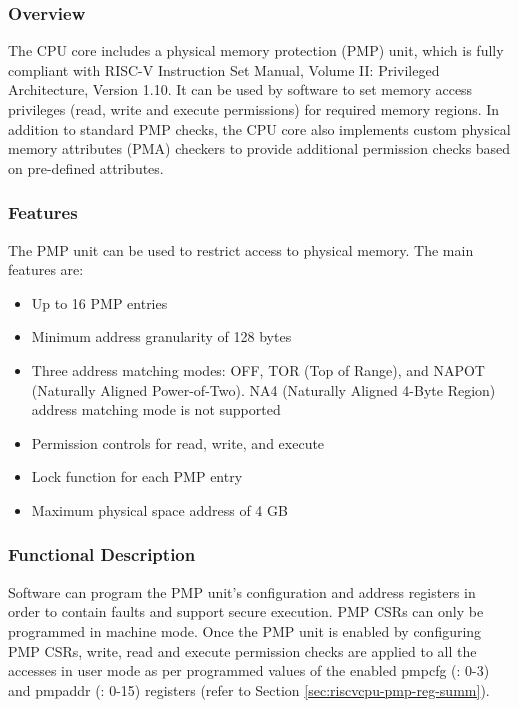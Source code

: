 \documentclass[main\_\_EN.tex]{subfiles}
\begin{document}
\subsubsection{Overview}
\label{sec:riscvcpu-pmp-overview}
The CPU core includes a physical memory protection (PMP) unit, which is fully compliant with RISC-V Instruction Set Manual, Volume II: Privileged Architecture, Version 1.10. It can be used by software to set memory access privileges (read, write and execute permissions) for required memory regions. In addition to standard PMP checks, the CPU core also implements custom physical memory attributes (PMA) checkers to provide additional permission checks based on pre-defined attributes.

\subsubsection{Features}
\label{sec:riscvcpu-pmp-features}

The PMP unit can be used to restrict access to physical memory. The main features are:

\begin{itemize}
    \item Up to 16 PMP entries
    \item Minimum address granularity of 128 bytes
    \item Three address matching modes: OFF, TOR (Top of Range), and NAPOT (Naturally Aligned Power-of-Two). NA4 (Naturally Aligned 4-Byte Region) address matching mode is not supported
    \item Permission controls for read, write, and execute
    \item Lock function for each PMP entry
    \item Maximum physical space address of 4 GB
\end{itemize}

\subsubsection{Functional Description}
\label{sec:riscvcpu-pmp-func-descr}
Software can program the PMP unit's configuration and address registers in order to contain faults and support secure execution. PMP CSRs can only be programmed in machine mode. Once the PMP unit is enabled by configuring PMP CSRs, write, read and execute permission checks are applied to all the accesses in user mode as per programmed values of the enabled pmpcfg (: 0-3) and pmpaddr (: 0-15) registers (refer to Section \ref{sec:riscvcpu-pmp-reg-summ}).
\end{document}
